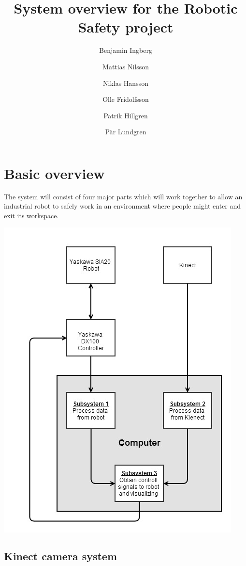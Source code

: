 \documentclass[10pt,a4paper,twocolumn,english]{article}
\title{System overview for the Robotic Safety project}
\author{Benjamin Ingberg \and Mattias Nilsson \and Niklas Hansson \and Olle Fridolfsson \and Patrik Hillgren \and Pär Lundgren }
\begin{document}
\twocolumn[\maketitle]
\clearpage
\twocolumn[\tableofcontents]
\clearpage

\section{Basic overview}

The system will consist of four major parts which will work together to allow an industrial robot to safely work in an environment where people might enter and exit its workspace.

\includegraphics[width=\columnwidth]{robot_safety.jpg}

\subsection{Kinect camera system}
\end{document}

